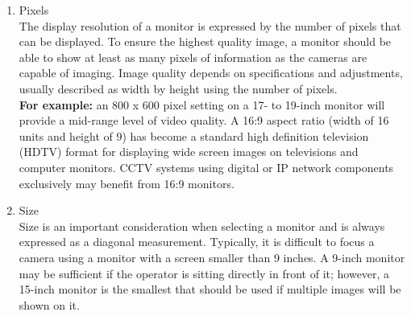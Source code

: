 \documentclass[12pt,fleqn]{book} %
\begin{document}
    \begin{enumerate}
        \item Pixels
\\ The display resolution of a monitor is expressed by the number of pixels that can be displayed. 
To ensure the highest quality image, a monitor should be able to show at least as many pixels of information as the cameras are capable of imaging. Image quality depends on specifications and adjustments, usually described as width by height using the number of pixels. 
\\ \textbf{For example:} an 800 x 600 pixel setting on a 17- to 19-inch monitor will provide a mid-range level of video quality. A 16:9 aspect ratio (width of 16 units and height of 9) has become a standard high definition television (HDTV) format for displaying wide screen images on televisions and computer monitors. CCTV systems using digital or IP network components exclusively may benefit from 16:9 monitors.

        \item  Size 
      \\ Size is an important consideration when selecting a monitor and is always expressed as a diagonal measurement. Typically, it is difficult to focus a camera using a monitor with a screen smaller than 9 inches. A 9-inch monitor may be sufficient if the operator is sitting directly in front of it; however, a 15-inch monitor is the smallest that should be used if multiple images will be shown on it. 
      


\end{enumerate}
\end{document}
